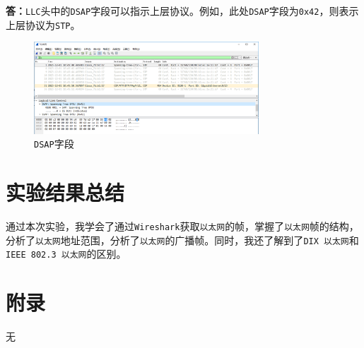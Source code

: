 \documentclass{article}
\begin{document}
\begin{enumerate}[noitemsep]
        \textbf{答：}\texttt{LLC}头中的\texttt{DSAP}字段可以指示上层协议。例如，此处\texttt{DSAP}字段为\texttt{0x42}，则表示上层协议为\texttt{STP}。

        \begin{figure}[H]
          \centering
          \includegraphics[width=0.75\textwidth]{images/19.png}
          \caption{\texttt{DSAP}字段}
        \end{figure}

\end{enumerate}


\section{实验结果总结}

通过本次实验，我学会了通过\texttt{Wireshark}获取\texttt{以太网}的帧，掌握了\texttt{以太网}帧的结构，分析了\texttt{以太网}地址范围，分析了\texttt{以太网}的广播帧。同时，我还了解到了\texttt{DIX 以太网}和\texttt{IEEE 802.3 以太网}的区别。

\section{附录}

无
\end{document}
